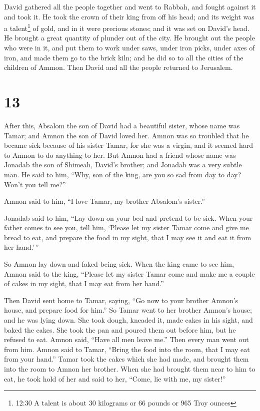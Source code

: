  David gathered all the people together and went to Rabbah,
and fought against it and took it.  He took the crown of
their king from off his head; and its weight was a talent\footnote{12:30
  A talent is about 30 kilograms or 66 pounds or 965 Troy ounces} of
gold, and in it were precious stones; and it was set on David's head. He
brought a great quantity of plunder out of the city.  He
brought out the people who were in it, and put them to work under saws,
under iron picks, under axes of iron, and made them go to the brick
kiln; and he did so to all the cities of the children of Ammon. Then
David and all the people returned to Jerusalem.

\hypertarget{section-12}{%
\section{13}\label{section-12}}

 After this, Absalom the son of David had a beautiful
sister, whose name was Tamar; and Amnon the son of David loved her.
 Amnon was so troubled that he became sick because of his
sister Tamar, for she was a virgin, and it seemed hard to Amnon to do
anything to her.  But Amnon had a friend whose name was
Jonadab the son of Shimeah, David's brother; and Jonadab was a very
subtle man.  He said to him, ``Why, son of the king, are you
so sad from day to day? Won't you tell me?''

Amnon said to him, ``I love Tamar, my brother Absalom's sister.''

 Jonadab said to him, ``Lay down on your bed and pretend to
be sick. When your father comes to see you, tell him, `Please let my
sister Tamar come and give me bread to eat, and prepare the food in my
sight, that I may see it and eat it from her hand.'\,''

 So Amnon lay down and faked being sick. When the king came
to see him, Amnon said to the king, ``Please let my sister Tamar come
and make me a couple of cakes in my sight, that I may eat from her
hand.''

 Then David sent home to Tamar, saying, ``Go now to your
brother Amnon's house, and prepare food for him.''  So Tamar
went to her brother Amnon's house; and he was lying down. She took
dough, kneaded it, made cakes in his sight, and baked the cakes.
 She took the pan and poured them out before him, but he
refused to eat. Amnon said, ``Have all men leave me.'' Then every man
went out from him.  Amnon said to Tamar, ``Bring the food
into the room, that I may eat from your hand.'' Tamar took the cakes
which she had made, and brought them into the room to Amnon her brother.
 When she had brought them near to him to eat, he took hold
of her and said to her, ``Come, lie with me, my sister!''

